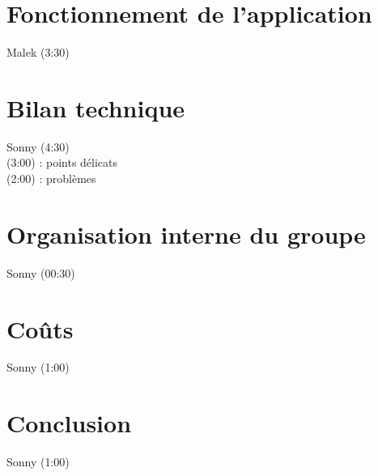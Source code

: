 	\section{Fonctionnement de l'application}
		\begin{frame}
			Malek (3:30)
		\end{frame}
	
	
	\section{Bilan technique}
		\begin{frame}
			Sonny (4:30)\\
			(3:00) : points délicats\\
			(2:00) : problèmes\\
		\end{frame}
	
	\section{Organisation interne du groupe}
		\begin{frame}
			Sonny (00:30)
		\end{frame}
	
	\section{Coûts}
		\begin{frame}
			Sonny (1:00)
		\end{frame}
	
	\section{Conclusion}
		\begin{frame}
			Sonny (1:00)
		\end{frame}
	

